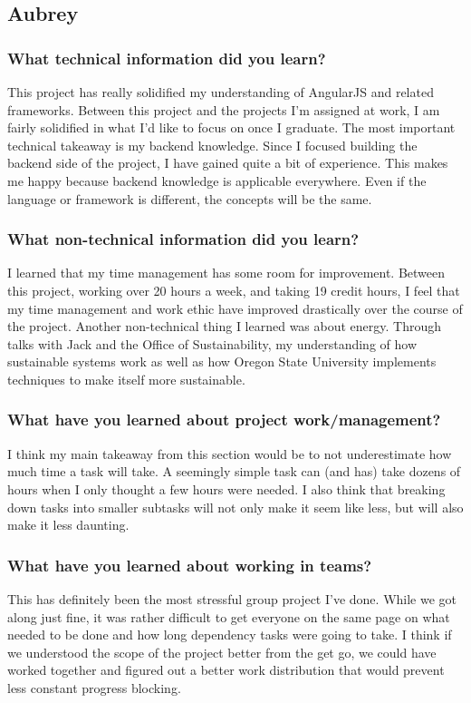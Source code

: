 \documentclass[journal,10pt,onecolumn,compsoc]{IEEEtran}
\begin{document}
    \subsection{Aubrey}
    \subsubsection{What technical information did you learn?}    
	This project has really solidified my understanding of AngularJS and related frameworks. Between this project and the projects I'm assigned at work, I am fairly solidified in what I'd like to focus on once I graduate. The most important technical takeaway is my backend knowledge. Since I focused building the backend side of the project, I have gained quite a bit of experience. This makes me happy because backend knowledge is applicable everywhere. Even if the language or framework is different, the concepts will be the same.
    \subsubsection{What non-technical information did you learn?}
	I learned that my time management has some room for improvement. Between this project, working over 20 hours a week, and taking 19 credit hours, I feel that my time management and work ethic have improved drastically over the course of the project. Another non-technical thing I learned was about energy. Through talks with Jack and the Office of Sustainability, my understanding of how sustainable systems work as well as how Oregon State University implements techniques to make itself more sustainable.
    \subsubsection{What have you learned about project work/management?}
	I think my main takeaway from this section would be to not underestimate how much time a task will take. A seemingly simple task can (and has) take dozens of hours when I only thought a few hours were needed. I also think that breaking down tasks into smaller subtasks will not only make it seem like less, but will also make it less daunting.
    \subsubsection{What have you learned about working in teams?}
	This has definitely been the most stressful group project I've done. While we got along just fine, it was rather difficult to get everyone on the same page on what needed to be done and how long dependency tasks were going to take. I think if we understood the scope of the project better from the get go, we could have worked together and figured out a better work distribution that would prevent less constant progress blocking.
\end{document}
